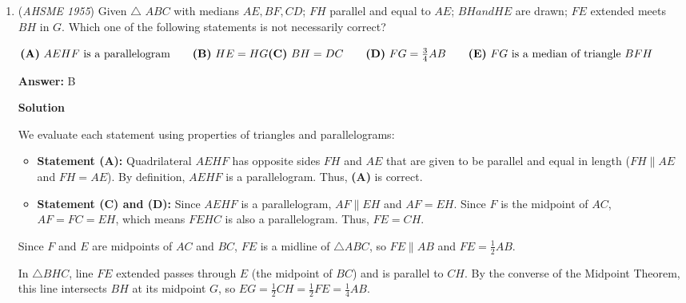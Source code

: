 \begin{enumerate}
 \textbf{Answer: }C



\textbf{Solution}

Using the FOIL method, we see that $(a+b)(a+c) = a^2 + ab + ac + bc.$ We want to solve 
 \[a + bc = a^2 + ab + ac + bc\]
 \[a = a^2 + ab + ac\]
 \[a((a + b + c) - 1) = 0\]These expressions are $\boxed{\text{(C) equal whenever }  a + b + c = 1.}$



	\item (\textit{AHSME 1955}) Given $\triangle$ $ABC$ with medians $AE, BF, CD$; $FH$ parallel and equal to $AE$; $BH and HE$ are drawn; $FE$ extended meets $BH$ in $G$. 
Which one of the following statements is not necessarily correct? 


 $\textbf{(A)}\ AEHF\text{ is a parallelogram}\qquad\textbf{(B)}\ HE=HG\\ \textbf{(C)}\ BH=DC\qquad\textbf{(D)}\ FG=\frac{3}{4}AB\qquad\textbf{(E)}\ FG\text{ is a median of triangle }BFH$

 \textbf{Answer: }B



\textbf{Solution}

We evaluate each statement using properties of triangles and parallelograms:

 
            \begin{itemize}
        \item \textbf{Statement (A):} Quadrilateral $AEHF$ has opposite sides $FH$ and $AE$ that are given to be parallel and equal in length ($FH \parallel AE$ and $FH = AE$). By definition, $AEHF$ is a parallelogram. Thus, \textbf{(A)} is correct.
            \end{itemize}
            
            \begin{itemize}
        \item \textbf{Statement (C) and (D):} Since $AEHF$ is a parallelogram, $AF \parallel EH$ and $AF = EH$. Since $F$ is the midpoint of $AC$, $AF = FC = EH$, which means $FEHC$ is also a parallelogram. Thus, $FE = CH$.
            \end{itemize}
            Since $F$ and $E$ are midpoints of $AC$ and $BC$, $FE$ is a midline of $\triangle ABC$, so $FE \parallel AB$ and $FE = \frac{1}{2}AB$. 

 In $\triangle BHC$, line $FE$ extended passes through $E$ (the midpoint of $BC$) and is parallel to $CH$. By the converse of the Midpoint Theorem, this line intersects $BH$ at its midpoint $G$, so $EG = \frac{1}{2}CH = \frac{1}{2}FE = \frac{1}{4}AB$. 


\end{enumerate}
